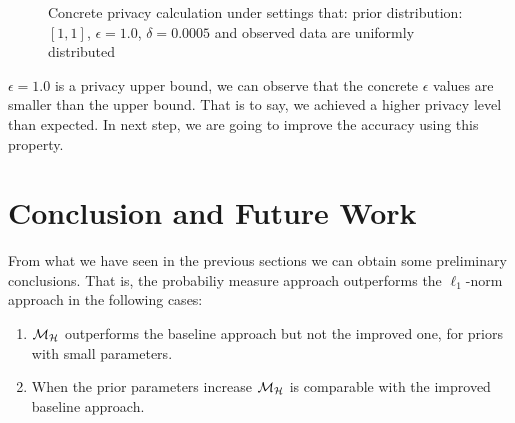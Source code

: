 \documentclass{article}
\begin{document}
\begin{figure}
\begin{center}
\centering
\caption{Concrete privacy calculation under settings that: prior distribution:$[1,1]$, $\epsilon = 1.0$, $\delta = 0.0005$ and observed data are uniformly distributed}
\label{fig_privacy}
\end{center}
\end{figure}

$\epsilon = 1.0$ is a privacy upper bound, we can observe that the concrete $\epsilon$ values are smaller than the upper bound. That is to say, we achieved a higher privacy level than expected. In next step, we are going to improve the accuracy using this property.


\section{Conclusion and Future Work}
From what we have seen in the previous sections we can obtain some preliminary conclusions. That is, the probabiliy measure approach outperforms the $\ell_1$-norm approach in the following cases:

\begin{enumerate}
	\item  $\mathcal{M}_{\mathcal{H}}$ outperforms the baseline approach but not the improved one, for priors with small parameters.
  	\item When the prior parameters increase $\mathcal{M}_{\mathcal{H}}$ is comparable with the improved baseline approach.
\end{enumerate}
\end{document}
